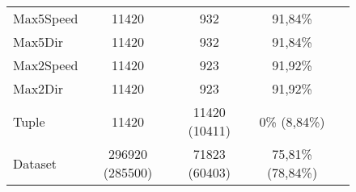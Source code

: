 \begin{figure}[H]
\begin{tabular}{lcccc}
		Max5Speed	 &              11420  & 932             & 91,84\% \\ 
		Max5Dir	 	&               11420 &  932             & 91,84\% \\
		Max2Speed	 &              11420  & 923             & 91,92\% \\
		Max2Dir		 &              11420  & 923             & 91,92\% \\
		\midrule
		Tuple 		&				11420  &	11420 (10411)			   & 0\% (8,84\%)\\
		Dataset  	&	   296920 (285500)  &	71823 (60403) 		   & 75,81\% (78,84\%)\\
	\end{tabular}
	\label{tab:completezza weather from Apr 2007 to 2017}
\end{figure}
